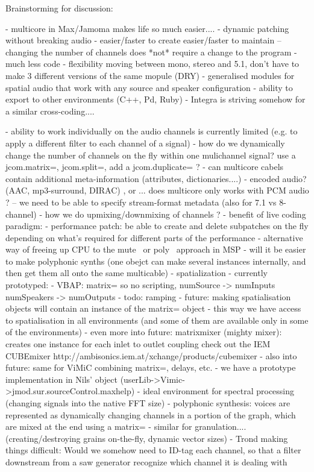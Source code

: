 \documentclass[twoside,a4paper]{article}
\begin{document}
Brainstorming for discussion:


- multicore in Max/Jamoma makes life so much easier....
    - dynamic patching without breaking audio
    - easier/faster to create easier/faster to maintain -- changing the number of channels does *not* require a change to the program
    - much less code 
    - flexibility moving between mono, stereo and 5.1, don't have to make 3 different versions of the same mopule (DRY)
    - generalised modules for spatial audio that work with any source and speaker configuration
    - ability to export to other environments (C++, Pd, Ruby)
    - Integra is striving somehow for a similar cross-coding....

- ability to work individually on the audio channels is currently limited (e.g. to apply a different filter to each channel of a signal)
- how do we dynamically change the number of channels on the fly within one mulichannel signal? use a jcom.matrix=, jcom.split=, add a jcom.duplicate= ? 
- can multicore cabels contain additional meta-information (attributes, dictionaries....)
- encoded audio? (AAC, mp3-surround, DIRAC) , or ... does multicore only works with PCM audio ? -- we need to be able to specify stream-format metadata (also for 7.1 vs 8-channel)
- how we do upmixing/downmixing of channels ? 
- benefit of live coding paradigm:
    - performance patch: be able to create and delete subpatches on the fly depending on what's required for different parts of the performance
    - alternative way of freeing up CPU to the mute~ or poly~ approach in MSP
    - will it be easier to make polyphonic synths (one obejct can make several instances internally, and then get them all onto the same multicable)
    - spatialization - currently prototyped:
        - VBAP: matrix= so no scripting, 
            numSource -> numInputs
            numSpeakers -> numOutputs
        - todo: ramping
        - future: making spatialisation objects will contain an instance of the matrix= object
        - this way we have access to spatialisation in all environments
            (and some of them are available only in some of the environments)
        - even more into future: matrixmixer (mighty mixer): creates one instance for each inlet to outlet coupling
                                    check out the IEM CUBEmixer  http://ambisonics.iem.at/xchange/products/cubemixer
        - also into future: same for ViMiC combining matrix=, delays, etc.
        - we have a prototype implementation in Nils' object (userLib->Vimic->jmod.sur.sourceControl.maxhelp)
        - ideal environment for spectral processing (changing signals into the native FFT size)
    - polyphonic synthesis: voices are represented as dynamically changing channels in a portion of the graph, which are mixed at the end using a matrix=
    - similar for granulation.... (creating/destroying grains on-the-fly, dynamic vector sizes)
        - Trond making things difficult: Would we somehow need to ID-tag each channel, so that a filter downstream from a saw generator recognize which channel it is dealing with
\end{document}
